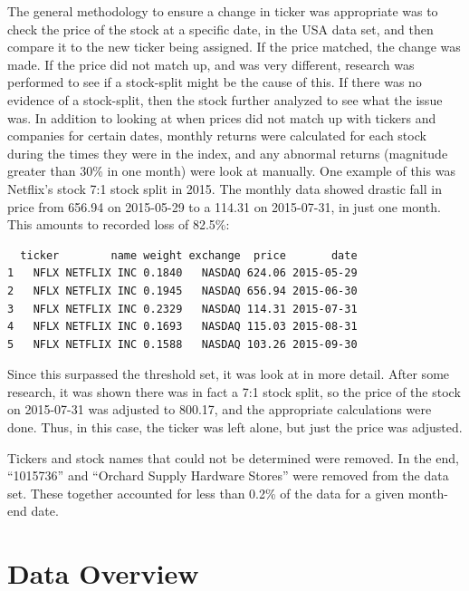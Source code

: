 \documentclass[12pt,twoside]{reedthesis}
\theoremstyle{definition}
\theoremstyle{definition}
\theoremstyle{definition}
\theoremstyle{remark}
\begin{document}
The general methodology to ensure a change in ticker was appropriate was
to check the price of the stock at a specific date, in the USA data set,
and then compare it to the new ticker being assigned. If the price
matched, the change was made. If the price did not match up, and was
very different, research was performed to see if a stock-split might be
the cause of this. If there was no evidence of a stock-split, then the
stock further analyzed to see what the issue was. In addition to looking
at when prices did not match up with tickers and companies for certain
dates, monthly returns were calculated for each stock during the times
they were in the index, and any abnormal returns (magnitude greater than
30\% in one month) were look at manually. One example of this was
Netflix's stock 7:1 stock split in 2015. The monthly data showed drastic
fall in price from 656.94 on 2015-05-29 to a 114.31 on 2015-07-31, in
just one month. This amounts to recorded loss of 82.5\%:
\begin{verbatim}
  ticker        name weight exchange  price       date
1   NFLX NETFLIX INC 0.1840   NASDAQ 624.06 2015-05-29
2   NFLX NETFLIX INC 0.1945   NASDAQ 656.94 2015-06-30
3   NFLX NETFLIX INC 0.2329   NASDAQ 114.31 2015-07-31
4   NFLX NETFLIX INC 0.1693   NASDAQ 115.03 2015-08-31
5   NFLX NETFLIX INC 0.1588   NASDAQ 103.26 2015-09-30
\end{verbatim}
Since this surpassed the threshold set, it was look at in more detail.
After some research, it was shown there was in fact a 7:1 stock split,
so the price of the stock on 2015-07-31 was adjusted to 800.17, and the
appropriate calculations were done. Thus, in this case, the ticker was
left alone, but just the price was adjusted.

Tickers and stock names that could not be determined were removed. In
the end, ``1015736'' and ``Orchard Supply Hardware Stores'' were removed
from the data set. These together accounted for less than 0.2\% of the
data for a given month-end date.

\section{Data Overview}\label{data-overview}
\end{document}
